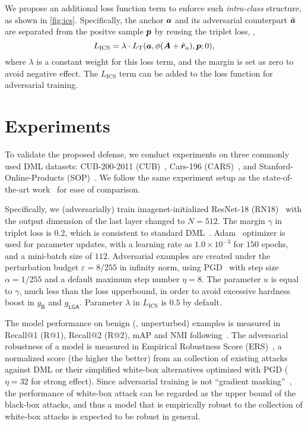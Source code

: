 \documentclass[10pt,twocolumn,letterpaper]{article}
\begin{document}

We propose an additional loss function term to enforce such \emph{intra-class}
structure, as shown in \cref{fig:ics}.
%
Specifically, the anchor ${\bm{a}}$ and its adversarial counterpart $\tilde{{\bm{a}}}$
are separated from the positve sample ${\bm{p}}$ by reusing the triplet loss,
\ie,
%
\begin{equation}
	L_\text{ICS} = \lambda \cdot L_\text{T}(
	{\bm{a}}, \phi({\bm{A}} + \hat{{\bm{r}}}_a), {\bm{p}}; 0),
\end{equation}
%
where $\lambda$ is a constant weight for this loss term,
and the margin is set as zero to avoid negative effect.
%
The $L_\text{ICS}$ term can be added to the loss function for
adversarial training.

\section{Experiments}
\label{sec:4}


To validate the proposed defense, we conduct experiments
on three commonly used DML datasets: CUB-200-2011 (CUB)~\cite{cub200}, Cars-196
(CARS)~\cite{cars196}, and Stanford-Online-Products (SOP)~\cite{sop}.
%
We follow the same experiment setup as the state-of-the-art work~\cite{robrank,revisiting}
for ease of comparison.




Specifically, we (adversarially) train imagenet-initialized ResNet-18
(RN18)~\cite{resnet} with the output dimension of the last layer changed to
$N{=}512$.
%
The margin $\gamma$ in triplet loss is $0.2$, which is consistent to standard
DML~\cite{revisiting}.
%
Adam~\cite{adam} optimizer is used for parameter updates, with a learning rate
as $1.0{\times}10^{-3}$ for $150$ epochs, and a mini-batch size of $112$.
%
Adversarial examples are created under the perturbation budget
$\varepsilon{=}8/255$ in infinity norm, using PGD~\cite{madry} with step size
$\alpha{=}1/255$ and a default maximum step number $\eta{=}8$.
%
The parameter $u$ is equal to $\gamma$, much less than the loss upperbound,
in order to avoid excessive hardness boost in $g_\mathsf{B}$ and $g_\mathsf{LGA}$.
%
Parameter $\lambda$ in $L_\text{ICS}$ is $0.5$ by default.

The model performance on benign (\ie, unperturbed) examples is measured in
Recall@1 (R@1), Recall@2 (R@2), mAP and NMI
following~\cite{revisiting,robrank}.
%
The adversarial robustness of a model is measured in Empirical Robustness Score
(ERS)~\cite{robrank}, a normalized score (the higher the better) from
an collection of existing attacks against DML or their simplified white-box
alternatives optimized with PGD ($\eta=32$ for strong effect).
%
Since adversarial training is not ``gradient masking''~\cite{obfuscated}, the
performance of white-box attack can be regarded as the upper bound of the
black-box attacks, and thus a model that is empirically robust to the collection
of white-box attacks is expected to be robust in general.
\end{document}
